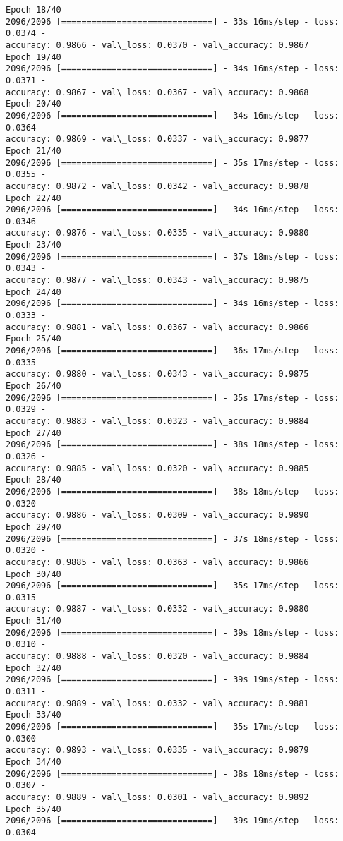\documentclass[11pt]{article}
\begin{document}
\begin{Verbatim}[commandchars=\\\{\}]
Epoch 18/40
2096/2096 [==============================] - 33s 16ms/step - loss: 0.0374 -
accuracy: 0.9866 - val\_loss: 0.0370 - val\_accuracy: 0.9867
Epoch 19/40
2096/2096 [==============================] - 34s 16ms/step - loss: 0.0371 -
accuracy: 0.9867 - val\_loss: 0.0367 - val\_accuracy: 0.9868
Epoch 20/40
2096/2096 [==============================] - 34s 16ms/step - loss: 0.0364 -
accuracy: 0.9869 - val\_loss: 0.0337 - val\_accuracy: 0.9877
Epoch 21/40
2096/2096 [==============================] - 35s 17ms/step - loss: 0.0355 -
accuracy: 0.9872 - val\_loss: 0.0342 - val\_accuracy: 0.9878
Epoch 22/40
2096/2096 [==============================] - 34s 16ms/step - loss: 0.0346 -
accuracy: 0.9876 - val\_loss: 0.0335 - val\_accuracy: 0.9880
Epoch 23/40
2096/2096 [==============================] - 37s 18ms/step - loss: 0.0343 -
accuracy: 0.9877 - val\_loss: 0.0343 - val\_accuracy: 0.9875
Epoch 24/40
2096/2096 [==============================] - 34s 16ms/step - loss: 0.0333 -
accuracy: 0.9881 - val\_loss: 0.0367 - val\_accuracy: 0.9866
Epoch 25/40
2096/2096 [==============================] - 36s 17ms/step - loss: 0.0335 -
accuracy: 0.9880 - val\_loss: 0.0343 - val\_accuracy: 0.9875
Epoch 26/40
2096/2096 [==============================] - 35s 17ms/step - loss: 0.0329 -
accuracy: 0.9883 - val\_loss: 0.0323 - val\_accuracy: 0.9884
Epoch 27/40
2096/2096 [==============================] - 38s 18ms/step - loss: 0.0326 -
accuracy: 0.9885 - val\_loss: 0.0320 - val\_accuracy: 0.9885
Epoch 28/40
2096/2096 [==============================] - 38s 18ms/step - loss: 0.0320 -
accuracy: 0.9886 - val\_loss: 0.0309 - val\_accuracy: 0.9890
Epoch 29/40
2096/2096 [==============================] - 37s 18ms/step - loss: 0.0320 -
accuracy: 0.9885 - val\_loss: 0.0363 - val\_accuracy: 0.9866
Epoch 30/40
2096/2096 [==============================] - 35s 17ms/step - loss: 0.0315 -
accuracy: 0.9887 - val\_loss: 0.0332 - val\_accuracy: 0.9880
Epoch 31/40
2096/2096 [==============================] - 39s 18ms/step - loss: 0.0310 -
accuracy: 0.9888 - val\_loss: 0.0320 - val\_accuracy: 0.9884
Epoch 32/40
2096/2096 [==============================] - 39s 19ms/step - loss: 0.0311 -
accuracy: 0.9889 - val\_loss: 0.0332 - val\_accuracy: 0.9881
Epoch 33/40
2096/2096 [==============================] - 35s 17ms/step - loss: 0.0300 -
accuracy: 0.9893 - val\_loss: 0.0335 - val\_accuracy: 0.9879
Epoch 34/40
2096/2096 [==============================] - 38s 18ms/step - loss: 0.0307 -
accuracy: 0.9889 - val\_loss: 0.0301 - val\_accuracy: 0.9892
Epoch 35/40
2096/2096 [==============================] - 39s 19ms/step - loss: 0.0304 -

\end{Verbatim}
\end{document}
